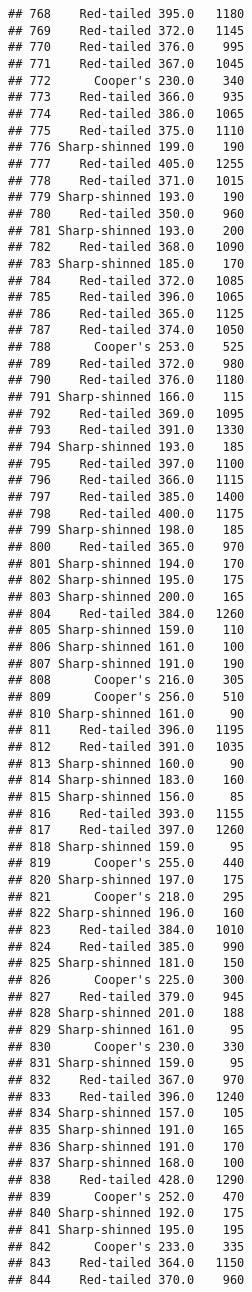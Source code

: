 \documentclass[
]{article}
\begin{document}
\begin{verbatim}
## 768    Red-tailed 395.0   1180
## 769    Red-tailed 372.0   1145
## 770    Red-tailed 376.0    995
## 771    Red-tailed 367.0   1045
## 772      Cooper's 230.0    340
## 773    Red-tailed 366.0    935
## 774    Red-tailed 386.0   1065
## 775    Red-tailed 375.0   1110
## 776 Sharp-shinned 199.0    190
## 777    Red-tailed 405.0   1255
## 778    Red-tailed 371.0   1015
## 779 Sharp-shinned 193.0    190
## 780    Red-tailed 350.0    960
## 781 Sharp-shinned 193.0    200
## 782    Red-tailed 368.0   1090
## 783 Sharp-shinned 185.0    170
## 784    Red-tailed 372.0   1085
## 785    Red-tailed 396.0   1065
## 786    Red-tailed 365.0   1125
## 787    Red-tailed 374.0   1050
## 788      Cooper's 253.0    525
## 789    Red-tailed 372.0    980
## 790    Red-tailed 376.0   1180
## 791 Sharp-shinned 166.0    115
## 792    Red-tailed 369.0   1095
## 793    Red-tailed 391.0   1330
## 794 Sharp-shinned 193.0    185
## 795    Red-tailed 397.0   1100
## 796    Red-tailed 366.0   1115
## 797    Red-tailed 385.0   1400
## 798    Red-tailed 400.0   1175
## 799 Sharp-shinned 198.0    185
## 800    Red-tailed 365.0    970
## 801 Sharp-shinned 194.0    170
## 802 Sharp-shinned 195.0    175
## 803 Sharp-shinned 200.0    165
## 804    Red-tailed 384.0   1260
## 805 Sharp-shinned 159.0    110
## 806 Sharp-shinned 161.0    100
## 807 Sharp-shinned 191.0    190
## 808      Cooper's 216.0    305
## 809      Cooper's 256.0    510
## 810 Sharp-shinned 161.0     90
## 811    Red-tailed 396.0   1195
## 812    Red-tailed 391.0   1035
## 813 Sharp-shinned 160.0     90
## 814 Sharp-shinned 183.0    160
## 815 Sharp-shinned 156.0     85
## 816    Red-tailed 393.0   1155
## 817    Red-tailed 397.0   1260
## 818 Sharp-shinned 159.0     95
## 819      Cooper's 255.0    440
## 820 Sharp-shinned 197.0    175
## 821      Cooper's 218.0    295
## 822 Sharp-shinned 196.0    160
## 823    Red-tailed 384.0   1010
## 824    Red-tailed 385.0    990
## 825 Sharp-shinned 181.0    150
## 826      Cooper's 225.0    300
## 827    Red-tailed 379.0    945
## 828 Sharp-shinned 201.0    188
## 829 Sharp-shinned 161.0     95
## 830      Cooper's 230.0    330
## 831 Sharp-shinned 159.0     95
## 832    Red-tailed 367.0    970
## 833    Red-tailed 396.0   1240
## 834 Sharp-shinned 157.0    105
## 835 Sharp-shinned 191.0    165
## 836 Sharp-shinned 191.0    170
## 837 Sharp-shinned 168.0    100
## 838    Red-tailed 428.0   1290
## 839      Cooper's 252.0    470
## 840 Sharp-shinned 192.0    175
## 841 Sharp-shinned 195.0    195
## 842      Cooper's 233.0    335
## 843    Red-tailed 364.0   1150
## 844    Red-tailed 370.0    960

\end{verbatim}
\end{document}
